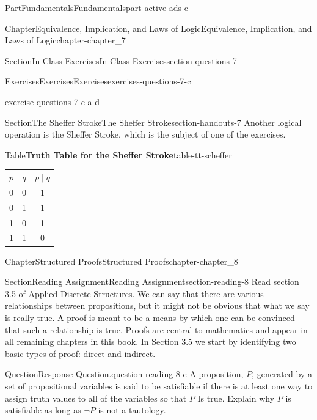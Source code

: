 \documentclass[oneside,10pt,]{book}
\newcommand{\tabularfont}{\relax}
\numberwithin{equation}{section}
\begin{document}
\begin{partptx}{Part}{Fundamentals}{}{Fundamentals}{}{}{part-active-ads-c}
\begin{chapterptx}{Chapter}{Equivalence, Implication, and Laws of Logic}{}{Equivalence, Implication, and Laws of Logic}{}{}{chapter-chapter_7}
\begin{sectionptx}{Section}{In-Class Exercises}{}{In-Class Exercises}{}{}{section-questions-7}
\begin{exercises-subsection-numberless}{Exercises}{Exercises}{}{Exercises}{}{}{exercises-questions-7-c}
\begin{exercisegroup}
\begin{divisionexerciseeg}{4}{}{}{exercise-questions-7-c-a-d}
%
\end{divisionexerciseeg}%
\end{exercisegroup}
\par\medskip\noindent
\end{exercises-subsection-numberless}
\end{sectionptx}
%
%
\typeout{************************************************}
\typeout{************************************************}
%
\begin{sectionptx}{Section}{The Sheffer Stroke}{}{The Sheffer Stroke}{}{}{section-handouts-7}
%
Another logical operation is the Sheffer Stroke, which is the subject of one of the exercises.%
\begin{tableptx}{Table}{\textbf{Truth Table for the Sheffer Stroke}}{table-tt-scheffer}{}%
\centering%
{\tabularfont%
\begin{tabular}{ccc}
\(p\)&\(q\)&\(p \mid q\)\tabularnewline[0pt]
0&0&1\tabularnewline[0pt]
0&1&1\tabularnewline[0pt]
1&0&1\tabularnewline[0pt]
1&1&0
\end{tabular}
}%
\end{tableptx}%
\end{sectionptx}
\end{chapterptx}
%
\typeout{************************************************}
\typeout{************************************************}
%
\begin{chapterptx}{Chapter}{Structured Proofs}{}{Structured Proofs}{}{}{chapter-chapter_8}
\renewcommand*{\chaptername}{Chapter}
%
%
%
\typeout{************************************************}
\typeout{************************************************}
%
\begin{sectionptx}{Section}{Reading Assignment}{}{Reading Assignment}{}{}{section-reading-8}
Read section 3.5 of Applied Discrete Structures.  We can say that there are various relationships between propositions, but it might not be obvious that what we say is really true.  A proof is meant to be a means by which one can be convinced that such a relationship is true. Proofs are central to mathematics and appear in all remaining chapters in this book.  In Section 3.5 we start by identifying two basic types of proof: direct and indirect.%
\begin{question}{Question}{Response Question.}{question-reading-8-c}%
A proposition, \(P\), generated by a set of propositional variables is said to be satisfiable if there is at least one way to assign truth values to all of the variables so that \(P\) Is true. Explain why \(P\) is satisfiable as long as \(\neg P\)  is not a tautology.%

\end{question}
\end{sectionptx}
\end{chapterptx}
\end{partptx}
\end{document}
